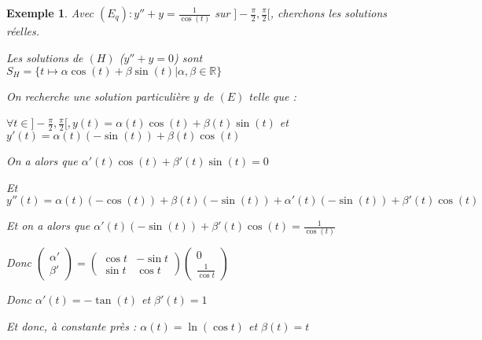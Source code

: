 \documentclass[a4paper,12pt]{book}
\newtheorem{Exe}{Exemple}[section]
\def\R{\mathbb{R}}
\begin{document}
\begin{Exe}
Avec $(E_q) : y'' + y = \frac{1}{\cos(t)}$ sur $]-\frac{\pi}{2},\frac{\pi}{2}[$, cherchons les solutions réelles.
\par Les solutions de $(H)$ ($y''+y=0$) sont $S_H = \{t\mapsto \alpha\cos(t)+\beta\sin(t) \vert \alpha, \beta\in\R\}$
\par On recherche une solution particulière $y$ de $(E)$ telle que :
\par $\forall t\in ]-\frac{\pi}{2}, \frac{\pi}{2}[, y(t) = \alpha(t)\cos(t) + \beta(t)\sin(t)$ et $y'(t) = \alpha(t)(-\sin(t))+\beta(t)\cos(t)$
\par On a alors que $\alpha'(t)\cos(t) + \beta'(t)\sin(t) = 0$
\par Et $y''(t) = \alpha(t)(-\cos(t)) + \beta(t)(-\sin(t)) + \alpha'(t)(-\sin(t))+\beta'(t)\cos(t)$
\par Et on a alors que $\alpha'(t)(-\sin(t))+\beta'(t)\cos(t)=\frac{1}{\cos(t)}$
\par Donc $\begin{pmatrix}\alpha' \\ \beta'\end{pmatrix} = \begin{pmatrix} \cos t & -\sin t \\ \sin t & \cos t\end{pmatrix}\begin{pmatrix} 0 \\ \frac{1}{\cos t}\end{pmatrix}$
\par Donc $\alpha'(t) = -\tan(t)$ et $\beta'(t) = 1$
\par Et donc, à constante près : $\alpha (t) = \ln(\cos t)$ et $\beta(t) = t$
\end{Exe}
\end{document}
